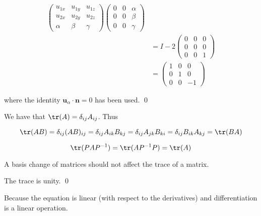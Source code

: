 \documentclass[12pt]{article}
\begin{document}
\begin{equation}
\begin{split}
\begin{pmatrix}
            u_{1x} & u_{1y} & u_{1z} \\
            u_{2x} & u_{2y} & u_{2z} \\
            \alpha & \beta  & \gamma
        \end{pmatrix}
        \begin{pmatrix}
            0 & 0 & \alpha \\
            0 & 0 & \beta  \\
            0 & 0 & \gamma
        \end{pmatrix} \\
        &=
        I - 2\begin{pmatrix}
            0 & 0 & 0 \\
            0 & 0 & 0 \\
            0 & 0 & 1
        \end{pmatrix} \\
        &=
        \begin{pmatrix}
            1 & 0 & 0  \\
            0 & 1 & 0  \\
            0 & 0 & -1
        \end{pmatrix}
    \end{split}
\end{equation}

where the identity $\mathbf{u}_{\alpha} \cdot \mathbf{n} = 0$ has been used.
\qed



We have that $\tr(A) = \delta_{ij} A_{ij}$. Thus

\begin{equation}
    \tr(AB) = \delta_{ij} (AB)_{ij} = \delta_{ij} A_{ik} B_{kj} = \delta_{ij} A_{jk} B_{ki} = \delta_{ij} B_{ik} A_{kj} = \tr(BA)
\end{equation}


\begin{equation}
    \tr(PAP^{-1}) = \tr(AP^{-1}P) = \tr(A)
\end{equation}

A basis change of matrices should not affect the trace of a matrix.

The trace is unity.
\qed



Because the equation is linear (with respect to the derivatives) and differentiation is a linear operation.
\end{document}
